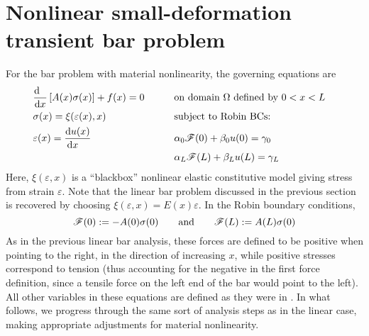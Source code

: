 \section{Nonlinear small-deformation transient \oneD bar problem}
For the \oneD bar problem with material nonlinearity, the governing equations are
\begin{equation}
\begin{aligned}
  &\frac{\mathrm{d}~~}{\mathrm{d} x}\left[A(x) \sigma(x)\right]+f(x)=0 \qquad  &          &\text{on domain $\Omega$ defined by }0<x<L& \\
  &\sigma(x)=\xi(\varepsilon(x),x)                  && \text{subject to Robin BCs: } \\
  &\varepsilon(x)=\frac{\mathrm{d} u(x)}{\mathrm{d} x~~~}         &&\alpha_0 \mathscr{F}(0)+\beta_0 u(0)=\gamma_0 \\
&\text{ }                                                  &&\alpha_L \mathscr{F}(L)+\beta_L u(L)=\gamma_L 
\end{aligned}
\label{eq:nonLinearBarStrongForm}
\end{equation}
Here, $\xi(\varepsilon,x)$ is a ``blackbox'' nonlinear elastic constitutive model giving stress from strain $\varepsilon$.  Note that the linear bar problem discussed in the previous section is recovered by choosing $\xi(\varepsilon,x)=E(x)\varepsilon$.  
In the Robin boundary conditions, 
\begin{equation}
  \mathscr{F}(0):= -A(0)\sigma(0)
\qquad\text{and}\qquad
  \mathscr{F}(L):=  A(L)\sigma(0)
\label{eq:nonLinboundaryForces}
\end{equation}
As in the previous linear bar analysis, these forces are defined to be positive when pointing to the right, in the direction of increasing $x$, while positive stresses correspond to tension (thus accounting for the negative in the first force definition, since a tensile force on the left end of the bar would point to the left). 
All other variables in these equations are defined as they were in . In what follows, we progress through the same sort of analysis steps as in the linear case, making appropriate adjustments for material nonlinearity.


